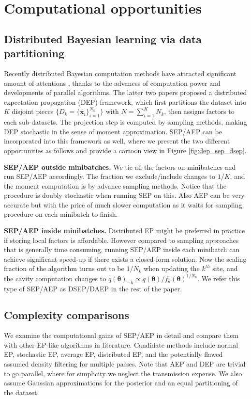 
\section{Computational opportunities}

\subsection{Distributed Bayesian learning via data partitioning}
Recently distributed Bayesian computation methods have attracted significant amount of attentions \cite{broderick:stream}\cite{gelman:dep}\cite{xu:sms}, thanks to the advances of computation power and developments of parallel algorithms. The latter two papers proposed a distributed expectation propagation (DEP) framework, which first partitions the dataset into $K$ disjoint pieces $\{ D_k = \{\bm{x}_i\}_{i=1}^{N_k} \}$ with $N = \sum_{i=1}^K N_k$, then assigns factors to each sub-datasets. The projection step is computed by sampling methods, making DEP stochastic in the sense of moment approximation. SEP/AEP can be incorporated into this framework as well, where we present the two different opportunities as follows and provide a cartoon view in Figure \ref{fig:dep_sep_dsep}.

\textbf{SEP/AEP outside minibatches.} We tie all the factors on minibatches and run SEP/AEP accordingly. The fraction we exclude/include changes to $1/K$, and the moment computation is by advance sampling methods. Notice that the procedure is doubly stochastic when running SEP on this. Also AEP can be very accurate but with the price of much slower computation as it waits for sampling procedure on each minibatch to finish.

\textbf{SEP/AEP inside minibatches.} Distributed EP might be preferred in practice if storing local factors is affordable. However compared to sampling approaches that is generally time consuming, running SEP/AEP inside each minibatch can achieve significant speed-up if there exists a closed-form solution. Now the scaling fraction of the algorithm turns out to be $1/N_k$ when updating the $k^{th}$ site, and the cavity computation changes to $q(\bm{\theta})_{-k} \propto q(\bm{\theta}) / f_k(\bm{\theta})^{1 / N_k}$. We refer this type of SEP/AEP as DSEP/DAEP in the rest of the paper.

\subsection{Complexity comparisons}
We examine the computational gains of SEP/AEP in detail and compare them with other EP-like algorithms in literature. Candidate methods include normal EP, stochastic EP, average EP, distributed EP, and the potentially flawed assumed density filtering for multiple passes. Note that AEP and DEP are trivial to go parallel, where for simplicity we neglect the transmission expense. We also assume Gaussian approximations for the posterior and an equal partitioning of the dataset.

